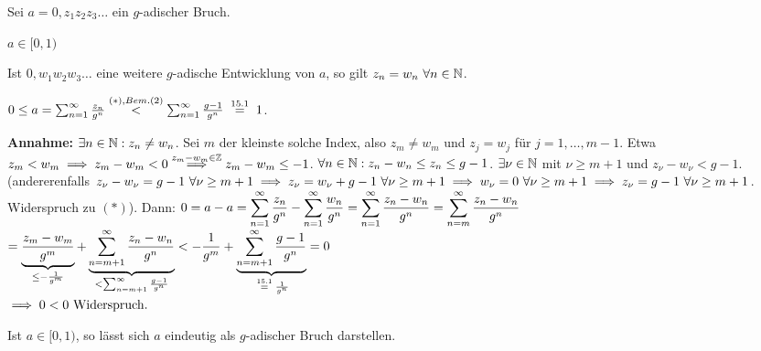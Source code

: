 \documentclass[a4paper,oneside,DIV15,BCOR12mm]{scrbook}
\begin{document}
\begin{satz}
Sei $a=0,z_1z_2z_3\ldots$ ein $g$-adischer Bruch.
\begin{liste}
\item $a\in[0,1)$
\item Ist $0,w_1w_2w_3\ldots$ eine weitere $g$-adische Entwicklung von $a$, so gilt $z_n = w_n \ \forall n\in\mathbb{N}$.
\end{liste}
\end{satz}

\begin{beweise}
\item $0 \le a = \reihe{\frac{z_n}{g^n}} \stackrel{\text{($*$)}, Bem. (2)}{<} \reihe{\frac{g-1}{g^n}} \gleichnach{15.1} 1$.
\item \textbf{Annahme:} $\exists n\in\mathbb{N}: z_n \ne w_n$. Sei $m$ der kleinste solche Index, also $z_m \ne w_m$ und $z_j = w_j$ für $j=1,\ldots ,m-1$. Etwa $z_m < w_m \implies z_m - w_m < 0 \overset{z_m - w_m \in\mathbb{Z}}{\implies} z_m - w_m \le -1$. $\forall n\in\mathbb{N}: z_n - w_n \le z_n \le g-1$. $\exists \nu \in\mathbb{N}$ mit $\nu \ge m+1$ und $z_\nu - w_\nu < g-1$. (andererenfalls $z_\nu - w_\nu = g-1 \ \forall \nu \ge m+1 \implies z_\nu = w_\nu + g-1 \ \forall \nu \ge m+1 \implies w_\nu = 0 \ \forall \nu \ge m+1 \implies z_\nu = g-1 \ \forall \nu \ge m+1$. Widerspruch zu $(*)$). Dann: 
$\displaystyle{0 = a-a = \sum_{n=1}^{\infty}{\frac{z_n}{g^n}} - \sum_{n=1}^{\infty}{\frac{w_n}{g^n}} = \sum_{n=1}^{\infty}{\frac{z_n - w_n}{g^n}} = \sum_{n=m}^\infty{\frac{z_n - w_n}{g^n}}}$\\
$\displaystyle{= \underbrace{\frac{z_m - w_m}{g^m}}_{\le -\frac{1}{g^m}} + \underbrace{\sum_{n=m+1}^\infty{\frac{z_n-w_n}{g^n}}}_{< \sum_{n=m+1}^\infty{\frac{g-1}{g^n}}} < - \frac{1}{g^m} + \underbrace{\sum_{n=m+1}^\infty{\frac{g-1}{g^n}}}_{\gleichnach{15.1} \frac{1}{g^n}} = 0}$\\
$\implies 0<0 \text{  Widerspruch.}$
\end{beweise}

\begin{satz}
Ist $a\in[0,1)$, so lässt sich $a$ eindeutig als $g$-adischer Bruch darstellen.
\end{satz}
\end{document}
